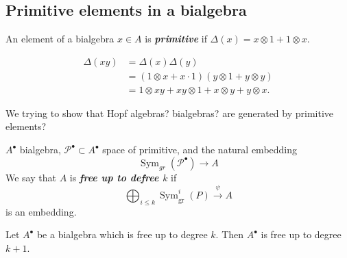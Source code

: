 \subsection{Primitive elements in a bialgebra}

\begin{defn}
	An element of a bialgebra $x\in A$ is \textit{\textbf{primitive}} if $\Delta(x)=x\otimes 1+1\otimes x$.
\end{defn}

\begin{align*}
	\Delta(xy)&=\Delta(x)\Delta(y)\\
	&=(1\otimes x+x\cdot 1)(y\otimes 1+y\otimes y)\\
	&=1\otimes xy+xy\otimes 1+x\otimes y+y\otimes x.
\end{align*}

\begin{remark}
	We trying to show that Hopf algebras? bialgebras? are generated by primitive elements?
\end{remark}

\begin{defn}
	$A^\bullet$ bialgebra, $\mathcal{P}^\bullet\subset A^\bullet$ space of primitive, and the natural embedding
	\[\operatorname{Sym}_{gr}(\mathcal{P}^\bullet)\to A\]
	We say that $A$ is \textit{\textbf{free up to defree $k$}} if
	\[\bigoplus_{i\leq k} \operatorname{Sym}_{\operatorname{gr}}^i(P)\overset{\psi}{\longrightarrow} A\]
	is an embedding.
\end{defn}

\begin{lemma}
	Let $A^\bullet$ be a bialgebra which is free up to degree $k$. Then $A^\bullet$ is free up to degree $k+1$.
\end{lemma}


